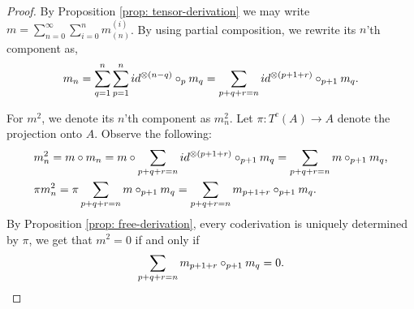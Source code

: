 \documentclass[../thesis.tex]{subfiles}
\begin{document}
        \begin{proof}
            By Proposition \ref{prop: tensor-derivation} we may write $m = \sum_{n = 0}^\infty \sum_{i = 0}^n m_{(n)}^{(i)}$. By using partial composition, we rewrite its $n$'th component as,
            \begin{align*}
                m_n = \sum_{q=1}^n\sum_{p = 1}^n id^{\otimes (n-q)}\circ_{p} m_q = \sum_{p + q + r = n}id^{\otimes (p+1+r)}\circ_{p+1}m_q\tt{.}
            \end{align*}

            For $m^2$, we denote its $n$'th component as $m^2_n$. Let $\pi : T^c(A) \rightarrow A$ denote the projection onto $A$. Observe the following:
            \begin{align*}
                & m^2_n = m\circ m_n = m\circ \sum_{p + q + r = n}id^{\otimes (p+1+r)}\circ_{p+1}m_q = \sum_{p + q + r = n}m\circ_{p+1}m_q\tt{,} \\
                & \pi m^2_n = \pi \sum_{p + q + r = n}m\circ_{p+1}m_q = \sum_{p + q + r = n}m_{p+1+r}\circ_{p+1}m_q\tt{.}
            \end{align*}
            By Proposition \ref{prop: free-derivation}, every coderivation is uniquely determined by $\pi$, we get that $m^2 = 0$ if and only if
            \begin{align*}
                \sum_{p+q+r = n}m_{p+1+r}\circ_{p+1}m_q = 0\tt{.}
            \end{align*}
        \end{proof}
\end{document}
